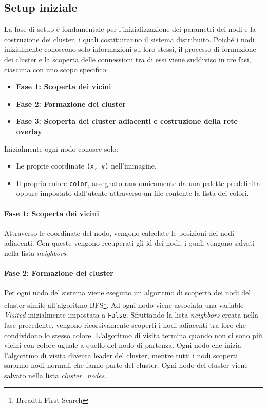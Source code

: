 \documentclass[12pt, a4paper]{report}
\begin{document}
\subsection{Setup iniziale}\label{subsec:setup}

La fase di setup \`e fondamentale per l'inizializzazione dei parametri dei nodi e la costruzione dei cluster, i quali costituiranno il sistema distribuito. Poiché i nodi inizialmente conoscono solo informazioni su loro stessi, il processo di formazione dei cluster e la scoperta delle connessioni tra di essi viene suddiviso in tre fasi, ciascuna con uno scopo specifico:

\begin{itemize}
    \item \textbf{Fase 1: Scoperta dei vicini}
    \item \textbf{Fase 2: Formazione dei cluster}
    \item \textbf{Fase 3: Scoperta dei cluster adiacenti e costruzione della rete overlay}
\end{itemize}


Inizialmente ogni nodo conosce solo:
\begin{itemize}
    \item Le proprie coordinate \texttt{(x, y)} nell'immagine.
    \item Il proprio colore \texttt{color}, assegnato randomicamente da una palette predefinita oppure impostato dall'utente attraverso un file contente la lista dei colori.
\end{itemize}

\paragraph{Fase 1: Scoperta dei vicini}
Attraverso le coordinate del nodo, vengono calcolate le posizioni dei nodi adiacenti. Con queste vengono recuperati gli id dei nodi, i quali vengono salvati nella lista \textit{neighbors}.

\paragraph{Fase 2: Formazione dei cluster}
Per ogni nodo del sistema viene eseguito un algoritmo di scoperta dei nodi del cluster simile all'algoritmo BFS\footnote{Breadth-First Search}. Ad ogni nodo viene associata una variable \textit{Visited} inizialmente impostata a \texttt{False}. Sfruttando la lista \textit{neighbors} creata nella fase precedente, vengono ricorsivamente scoperti i nodi adiacenti tra loro che condividono lo stesso colore. L'algoritmo di visita termina quando non ci sono pi\`u vicini con colore uguale a quello del nodo di partenza. Ogni nodo che inizia l'algoritmo di visita diventa leader del cluster, mentre tutti i nodi scoperti saranno nodi normali che fanno parte del cluster. Ogni nodo del cluster viene salvato nella lista \textit{cluster\_nodes}.
    
\end{document}
